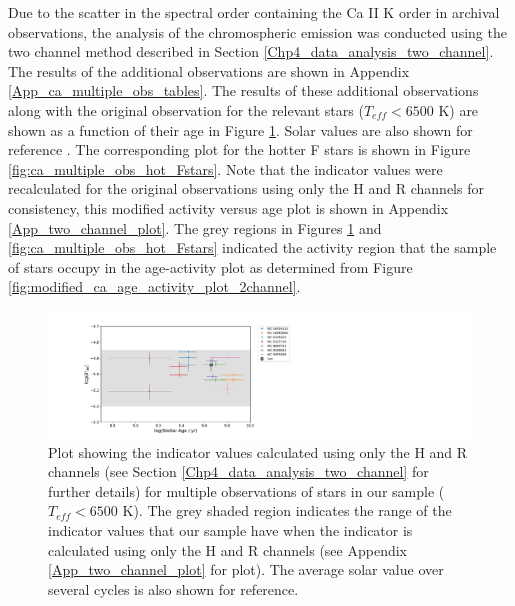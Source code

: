 Due to the scatter in the spectral order containing the Ca II K order in archival observations, the analysis of the chromospheric emission was conducted using the two channel method described in Section \ref{Chp4_data_analysis_two_channel}. The results of the additional observations are shown in Appendix \ref{App_ca_multiple_obs_tables}. The results of these additional observations along with the original observation for the relevant stars ($T_{eff} < 6500$ K) are shown as a function of their age in Figure \ref{fig:ca_multiple_obs}. Solar values are also shown for reference \citep{Egeland_etal_2017}. The corresponding plot for the hotter F stars is shown in Figure \ref{fig:ca_multiple_obs_hot_Fstars}. Note that the \Rprime indicator values were recalculated for the original observations using only the H and R channels for consistency, this modified activity versus age plot is shown in Appendix \ref{App_two_channel_plot}. The grey regions in Figures \ref{fig:ca_multiple_obs} and \ref{fig:ca_multiple_obs_hot_Fstars} indicated the activity region that the sample of stars occupy in the age-activity plot as determined from Figure \ref{fig:modified_ca_age_activity_plot_2channel}.

\begin{figure}
    \centering
    \includegraphics[scale=0.55]{Figures/4-Chromospheric_age/cool_multiple_obs_plot_with_sun.pdf}
    \caption[Plot showing activity over several epochs for stars with $T_{eff} < 6500$ K]{Plot showing the \Rprime indicator values calculated using only the H and R channels (see Section \ref{Chp4_data_analysis_two_channel} for further details) for multiple observations of stars in our sample ($T_{eff} < 6500$ K). The grey shaded region indicates the range of the \Rprime indicator values that our sample have when the \Rprime indicator is calculated using only the H and R channels (see Appendix \ref{App_two_channel_plot} for plot). The average solar value over several cycles \citep{Egeland_etal_2017} is also shown for reference.}
    \label{fig:ca_multiple_obs}
\end{figure}

